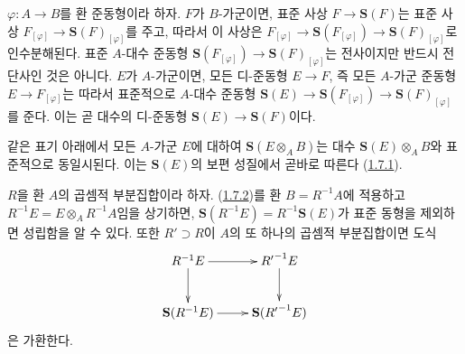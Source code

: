 \begin{env}[1.7.2]
\label{II.1.7.2-ko}
$\varphi:A\to B$를 환 준동형이라 하자. $F$가 $B$-가군이면, 표준 사상
$F\to\mathbf{S}(F)$는 표준 사상
$F_{[\varphi]}\to\mathbf{S}(F)_{[\varphi]}$를 주고, 따라서 이 사상은
$F_{[\varphi]}\to\mathbf{S}(F_{[\varphi]})\to
\mathbf{S}(F)_{[\varphi]}$로 인수분해된다. 표준 $A$-대수 준동형
$\mathbf{S}(F_{[\varphi]})\to\mathbf{S}(F)_{[\varphi]}$는 전사이지만
반드시 전단사인 것은 아니다. $E$가 $A$-가군이면, 모든 디-준동형
$E\to F$, 즉 모든 $A$-가군 준동형 $E\to F_{[\varphi]}$는 따라서
표준적으로 $A$-대수 준동형
$\mathbf{S}(E)\to\mathbf{S}(F_{[\varphi]})\to
\mathbf{S}(F)_{[\varphi]}$를 준다.
이는 곧 대수의 디-준동형 $\mathbf{S}(E)\to\mathbf{S}(F)$이다.

같은 표기 아래에서 모든 $A$-가군 $E$에 대하여
$\mathbf{S}(E\otimes_A B)$는 대수
$\mathbf{S}(E)\otimes_A B$와 표준적으로 동일시된다. 이는
$\mathbf{S}(E)$의 보편 성질에서 곧바로 따른다
(\hyperref[II.1.7.1-ko]{1.7.1}).
\end{env}

\begin{env}[1.7.3]
\label{II.1.7.3-ko}
$R$을 환 $A$의 곱셈적 부분집합이라 하자.
(\hyperref[II.1.7.2-ko]{1.7.2})를 환 $B=R^{-1}A$에 적용하고
$R^{-1}E=E\otimes_A R^{-1}A$임을 상기하면,
$\mathbf{S}(R^{-1}E)=R^{-1}\mathbf{S}(E)$가 표준 동형을 제외하면
성립함을 알 수 있다. 또한 $R'\supset R$이 $A$의 또 하나의 곱셈적
부분집합이면 도식
\[
  \xymatrix{
    R^{-1}E\ar[r]\ar[d] & {R'}^{-1}E\ar[d]\\
    \mathbf{S}(R^{-1}E)\ar[r] & \mathbf{S}({R'}^{-1}E)
  }
\]
은 가환한다.
\end{env}

